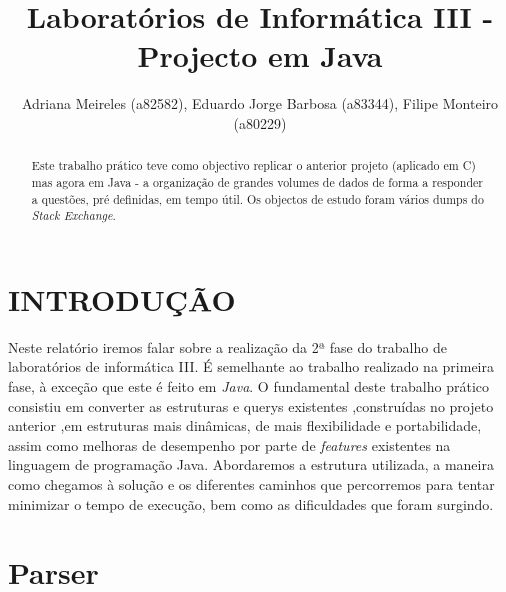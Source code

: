 \documentclass[letterpaper, 10 pt, conference]{IEEEtran}  %
\title{\LARGE \bf
Laboratórios de Informática III - Projecto em Java
}
\author{Adriana Meireles (a82582), Eduardo Jorge Barbosa (a83344), Filipe Monteiro (a80229)%
}
\begin{document}
\maketitle
\thispagestyle{empty}
\pagestyle{empty}


\begin{abstract}

Este trabalho prático teve como objectivo replicar o anterior projeto (aplicado em C) mas agora em Java - a organização de grandes volumes de dados de forma a responder a questões, pré definidas, em tempo útil. Os objectos de estudo foram vários dumps do \textit{Stack Exchange}.

\end{abstract}


\section{INTRODUÇÃO}

Neste relatório iremos falar sobre a realização da 2ª fase do trabalho de laboratórios de informática III.
É semelhante ao trabalho realizado na primeira fase, à exceção que este é feito em \textit{Java}.
\newline
O fundamental deste trabalho prático consistiu em converter as estruturas e querys existentes ,construídas no projeto anterior ,em estruturas mais dinâmicas, de mais flexibilidade e portabilidade, assim como melhoras de desempenho por parte de \textit{features} existentes na linguagem de programação Java.
\newline
Abordaremos a estrutura utilizada, a maneira como chegamos à solução e os diferentes caminhos que percorremos para tentar minimizar o tempo de execução, bem como as dificuldades que foram surgindo.


\section{Parser}
\end{document}
